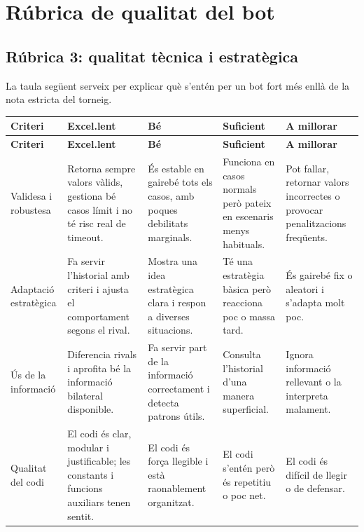 \documentclass[12pt,a4paper]{report}
\begin{document}
\chapter{Rúbrica de qualitat del bot}

\section{Rúbrica 3: qualitat tècnica i estratègica}

La taula següent serveix per explicar què s'entén per un bot fort més enllà de la
nota estricta del torneig.

\scriptsize
\renewcommand{\arraystretch}{1.2}
\begin{longtable}{@{}p{} p{} p{} p{} p{}@{}}
\toprule
\textbf{Criteri} & \textbf{Excel.lent} & \textbf{Bé} & \textbf{Suficient} & \textbf{A millorar} \\
\midrule
\endfirsthead
\toprule
\textbf{Criteri} & \textbf{Excel.lent} & \textbf{Bé} & \textbf{Suficient} & \textbf{A millorar} \\
\midrule
\endhead
Validesa i robustesa &
Retorna sempre valors vàlids, gestiona bé casos límit i no té risc real de timeout. &
És estable en gairebé tots els casos, amb poques debilitats marginals. &
Funciona en casos normals però pateix en escenaris menys habituals. &
Pot fallar, retornar valors incorrectes o provocar penalitzacions freqüents. \\

Adaptació estratègica &
Fa servir l'historial amb criteri i ajusta el comportament segons el rival. &
Mostra una idea estratègica clara i respon a diverses situacions. &
Té una estratègia bàsica però reacciona poc o massa tard. &
És gairebé fix o aleatori i s'adapta molt poc. \\

Ús de la informació &
Diferencia rivals i aprofita bé la informació bilateral disponible. &
Fa servir part de la informació correctament i detecta patrons útils. &
Consulta l'historial d'una manera superficial. &
Ignora informació rellevant o la interpreta malament. \\

Qualitat del codi &
El codi és clar, modular i justificable; les constants i funcions auxiliars tenen sentit. &
El codi és força llegible i està raonablement organitzat. &
El codi s'entén però és repetitiu o poc net. &
El codi és difícil de llegir o de defensar. \\
\bottomrule
\end{longtable}
\normalsize
\end{document}
